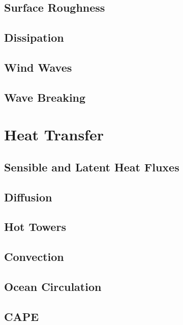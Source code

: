 \documentclass{report}
\begin{document}
    \section{Surface Roughness}
    \lipsum[1-2]

    \section{Dissipation}
    \lipsum[1-2]  	

    \section{Wind Waves}
    \lipsum[1-2]

    \section{Wave Breaking}
    \lipsum[1-2]

\chapter{Heat Transfer}
    \lipsum[10]
  
    \section{Sensible and Latent Heat Fluxes}
    \lipsum[1-2]
   
    \section{Diffusion}
    \lipsum[1-2]

    \section{Hot Towers}
    \lipsum[1-2]

    \section{Convection}
    \lipsum[1-2]

    \section{Ocean Circulation}
    \lipsum[1-2]

    \section{CAPE}
    \lipsum[1-2]
\end{document}
